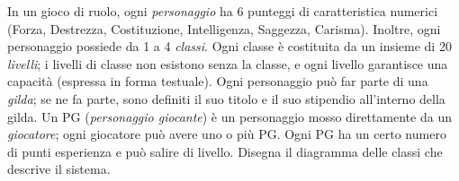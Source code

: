 \documentclass[a4paper,addpoints]{article}
\begin{document}
In un gioco di ruolo, ogni \emph{personaggio} ha 6 punteggi di caratteristica numerici (Forza, Destrezza, Costituzione, Intelligenza, Saggezza, Carisma). Inoltre, ogni personaggio possiede da 1 a 4 \emph{classi}. Ogni classe è costituita da un insieme di 20 \emph{livelli}; i livelli di classe non esistono senza la classe, e ogni livello garantisce una capacità (espressa in forma testuale). Ogni personaggio può far parte di una \emph{gilda}; se ne fa parte, sono definiti il suo titolo e il suo stipendio all'interno della gilda. Un PG (\emph{personaggio giocante}) è un personaggio mosso direttamente da un \emph{giocatore}; ogni giocatore può avere uno o più PG. Ogni PG ha un certo numero di punti esperienza e può salire di livello. Disegna il diagramma delle classi che descrive il sistema.

\vspace{1cm}
\begin{center}
\end{center}
\end{document}
